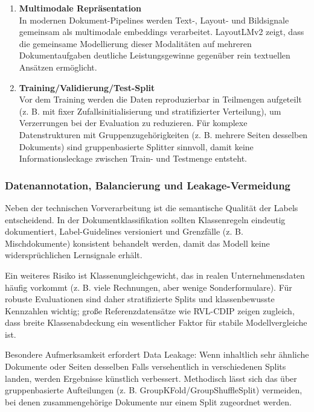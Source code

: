 \begin{enumerate}
    \item \textbf{Multimodale Repräsentation} \\ In modernen Dokument-Pipelines werden Text-, Layout- und Bildsignale gemeinsam als multimodale \gls{embedding}s verarbeitet. LayoutLMv2 zeigt, dass die gemeinsame Modellierung dieser Modalitäten auf mehreren Dokumentaufgaben deutliche Leistungsgewinne gegenüber rein textuellen Ansätzen ermöglicht. \cite{layoutlmv2_2021}
    \item \textbf{Training/Validierung/Test-Split} \\ Vor dem Training werden die Daten reproduzierbar in Teilmengen aufgeteilt (z. B. mit fixer Zufallsinitialisierung und stratifizierter Verteilung), um Verzerrungen bei der Evaluation zu reduzieren. Für komplexe Datenstrukturen mit Gruppenzugehörigkeiten (z. B. mehrere Seiten desselben Dokuments) sind gruppenbasierte Splitter sinnvoll, damit keine Informationsleckage zwischen Train- und Testmenge entsteht. \cite{sklearn_train_test_split} \cite{sklearn_cross_validation}
\end{enumerate}

\subsubsection{Datenannotation, Balancierung und Leakage-Vermeidung}

Neben der technischen Vorverarbeitung ist die semantische Qualität der Labels entscheidend. 
In der Dokumentklassifikation sollten Klassenregeln eindeutig dokumentiert, Label-Guidelines versioniert und Grenzfälle (z. B. Mischdokumente) konsistent behandelt werden, damit das Modell keine widersprüchlichen Lernsignale erhält. \cite{shaip2025dokumentenklassifizierung}

Ein weiteres Risiko ist Klassenungleichgewicht, das in realen Unternehmensdaten häufig vorkommt (z. B. viele Rechnungen, aber wenige Sonderformulare). 
Für robuste Evaluationen sind daher stratifizierte Splits und klassenbewusste Kennzahlen wichtig; große Referenzdatensätze wie RVL-CDIP zeigen zugleich, dass breite Klassenabdeckung ein wesentlicher Faktor für stabile Modellvergleiche ist. \cite{harley_rvlcdip} \cite{sklearn_train_test_split}

Besondere Aufmerksamkeit erfordert Data Leakage: Wenn inhaltlich sehr ähnliche Dokumente oder Seiten desselben Falls versehentlich in verschiedenen Splits landen, werden Ergebnisse künstlich verbessert. 
Methodisch lässt sich das über gruppenbasierte Aufteilungen (z. B. GroupKFold/GroupShuffleSplit) vermeiden, bei denen zusammengehörige Dokumente nur einem Split zugeordnet werden. \cite{sklearn_cross_validation}

